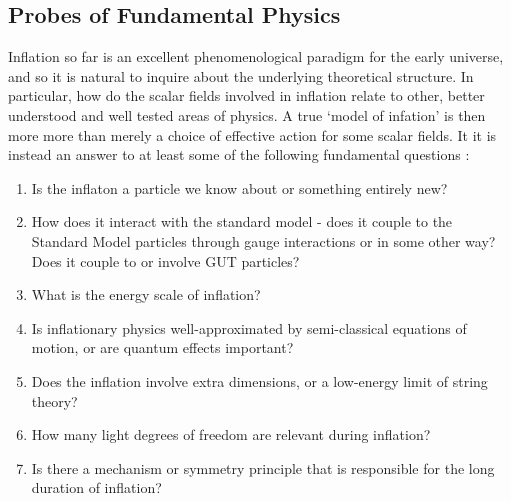 \documentclass[a4paper,10pt]{article}
\begin{document}




\subsection{Probes of Fundamental Physics}

Inflation so far is an excellent phenomenological paradigm for the early universe, and so it is natural to inquire about the underlying theoretical structure. In particular, how do the scalar fields involved in inflation relate to other, better understood and well tested areas of physics. A true `model of infation' is then more more than merely a choice of  effective action for some scalar fields. It it is instead an answer to at least some of the following fundamental questions \cite{CMBPol}:

\begin{enumerate}
\item Is the inflaton a particle we know about or something entirely new? 
\item How does it interact with the standard model - does it couple to the Standard Model particles through gauge interactions or in some other way? Does it couple to or involve GUT particles?
\item What is the energy scale of inflation?
\item Is inflationary physics well-approximated by semi-classical equations of motion, or are quantum effects important? 
\item Does the inflation involve extra dimensions, or a low-energy limit of string theory? 
\item How many light degrees of freedom are relevant during inflation? 
\item Is there a mechanism or symmetry principle that is responsible for the long duration of inflation?
\end{enumerate}
\end{document}
